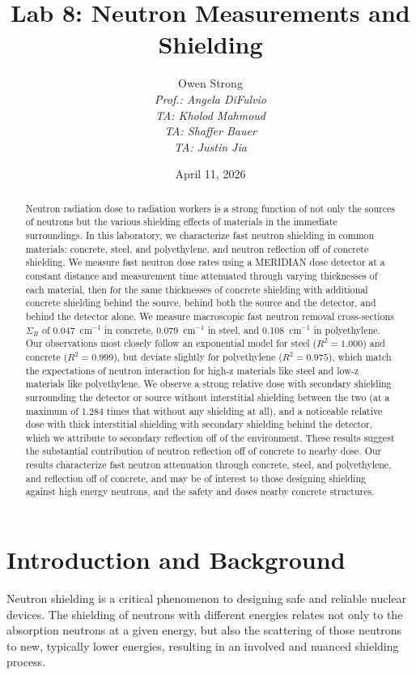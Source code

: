 \documentclass[12pt]{article}
\title{Lab 8: Neutron Measurements and Shielding}
\author{Owen Strong \\
\itshape Prof.: Angela DiFulvio\\
\itshape TA: Kholod Mahmoud \\
\itshape TA: Shaffer Bauer \\
\itshape TA: Justin Jia \\
}
\date{April 11, 2026}
\newcommand{\XSr}{\Sigma_R}
\newcommand{\incm}{$\mathrm{cm^{-1}}$\xspace}
\begin{document}
\maketitle
\pagebreak
{\hypersetup{linkcolor=black}\tableofcontents}
\pagebreak
{}
\begin{abstract}
    Neutron radiation dose to radiation workers is a strong function of not only the sources of neutrons but the various shielding effects of materials in the immediate surroundings.
    In this laboratory, we characterize fast neutron shielding in common materials: concrete, steel, and polyethylene, and neutron reflection off of concrete shielding.
    We measure fast neutron dose rates using a MERIDIAN dose detector at a constant distance and measurement time attenuated through varying thicknesses of each material, then for the same thicknesses of concrete shielding with additional concrete shielding behind the source, behind both the source and the detector, and behind the detector alone.
    We measure macroscopic fast neutron removal cross-sections $\XSr$ of 0.047~\incm in concrete, 0.079~\incm in steel, and 0.108~\incm in polyethylene.
    Our observations most closely follow an exponential model for steel ($R^2=1.000$) and concrete ($R^2=0.999$), but deviate slightly for polyethylene ($R^2=0.975$), which match the expectations of neutron interaction for high-z materials like steel and low-z materials like polyethylene.
    We observe a strong relative dose with secondary shielding surrounding the detector or source without interstitial shielding  between the two (at a maximum of 1.284 times that without any shielding at all), and a noticeable relative dose with thick interstitial shielding with secondary shielding behind the detector, which we attribute to secondary reflection off of the environment.
    These results suggest the substantial contribution of neutron reflection off of concrete to nearby dose.
    Our results characterize fast neutron attenuation through concrete, steel, and polyethylene, and reflection off of concrete, and may be of interest to those designing shielding against high energy neutrons, and the safety and doses nearby concrete structures.
\end{abstract}

\section{Introduction and Background}

Neutron shielding is a critical phenomenon to designing safe and reliable nuclear devices.
The shielding of neutrons with different energies relates not only to the absorption neutrons at a given energy, but also the scattering of those neutrons to new, typically lower energies, resulting in an involved and nuanced shielding process.\\
\end{document}
